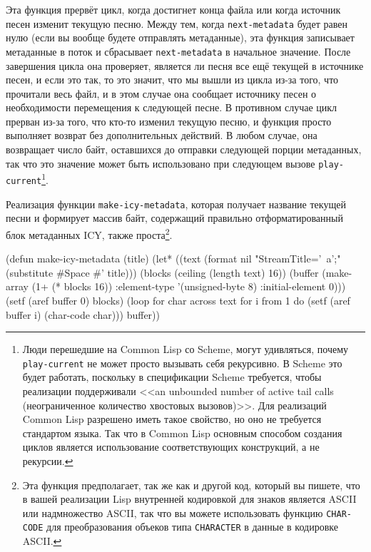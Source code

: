 Эта функция прервёт цикл, когда достигнет конца файла или когда источник песен изменит
текущую песню.  Между тем, когда \lstinline{next-metadata} будет равен нулю (если вы вообще
будете отправлять метаданные), эта функция записывает метаданные в поток и сбрасывает
\lstinline{next-metadata} в начальное значение.  После завершения цикла она проверяет,
является ли песня все ещё текущей в источнике песен, и если это так, то это значит, что мы
вышли из цикла из-за того, что прочитали весь файл, и в этом случае она сообщает источнику
песен о необходимости перемещения к следующей песне.  В противном случае цикл прерван
из-за того, что кто-то изменил текущую песню, и функция просто выполняет возврат без
дополнительных действий.  В любом случае, она возвращает число байт, оставшихся до
отправки следующей порции метаданных, так что это значение может быть использовано при
следующем вызове \lstinline{play-current}\footnote{Люди перешедшие на Common Lisp со Scheme,
  могут удивляться, почему \lstinline{play-current} не может просто вызывать себя рекурсивно.  В
  Scheme это будет работать, поскольку в спецификации Scheme требуется, чтобы реализации
  поддерживали <<an unbounded number of active tail calls (неограниченное количество
  хвостовых вызовов)>>.  Для реализаций Common Lisp разрешено иметь такое свойство, но оно
  не требуется стандартом языка.  Так что в Common Lisp основным способом создания циклов
  является использование соответствующих конструкций, а не рекурсии.}.

Реализация функции \lstinline{make-icy-metadata}, которая получает название текущей песни
и формирует массив байт, содержащий правильно отформатированный блок метаданных ICY, также
проста\footnote{Эта функция предполагает, так же как и другой код, который вы пишете, что
  в вашей реализации Lisp внутренней кодировкой для знаков является ASCII или надмножество
  ASCII, так что вы можете использовать функцию \lstinline{CHAR-CODE} для преобразования
  объеков типа \lstinline{CHARACTER} в данные в кодировке ASCII.}.

\begin{myverb}
(defun make-icy-metadata (title)
  (let* ((text (format nil "StreamTitle='~a';" (substitute #\bslash{}Space #\bslash{}' title)))
         (blocks (ceiling (length text) 16))
         (buffer (make-array (1+ (* blocks 16))
                             :element-type '(unsigned-byte 8)
                             :initial-element 0)))
    (setf (aref buffer 0) blocks)
    (loop 
       for char across text
       for i from 1 
       do (setf (aref buffer i) (char-code char)))
    buffer))
\end{myverb}

